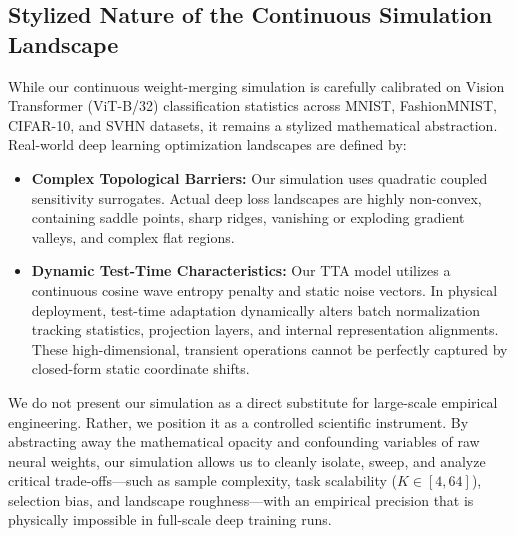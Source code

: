 \documentclass{article}
\theoremstyle{plain}
\theoremstyle{definition}
\theoremstyle{remark}
\begin{document}
\subsection{Stylized Nature of the Continuous Simulation Landscape}
While our continuous weight-merging simulation is carefully calibrated on Vision Transformer (ViT-B/32) classification statistics across MNIST, FashionMNIST, CIFAR-10, and SVHN datasets, it remains a stylized mathematical abstraction. 
Real-world deep learning optimization landscapes are defined by:
\begin{itemize}[noitemsep,topsep=0pt]
    \item \textbf{Complex Topological Barriers:} Our simulation uses quadratic coupled sensitivity surrogates. Actual deep loss landscapes are highly non-convex, containing saddle points, sharp ridges, vanishing or exploding gradient valleys, and complex flat regions.
    \item \textbf{Dynamic Test-Time Characteristics:} Our TTA model utilizes a continuous cosine wave entropy penalty and static noise vectors. In physical deployment, test-time adaptation dynamically alters batch normalization tracking statistics, projection layers, and internal representation alignments. These high-dimensional, transient operations cannot be perfectly captured by closed-form static coordinate shifts.
\end{itemize}
We do not present our simulation as a direct substitute for large-scale empirical engineering. Rather, we position it as a controlled scientific instrument. By abstracting away the mathematical opacity and confounding variables of raw neural weights, our simulation allows us to cleanly isolate, sweep, and analyze critical trade-offs—such as sample complexity, task scalability ($K \in [4, 64]$), selection bias, and landscape roughness—with an empirical precision that is physically impossible in full-scale deep training runs.
\end{document}
